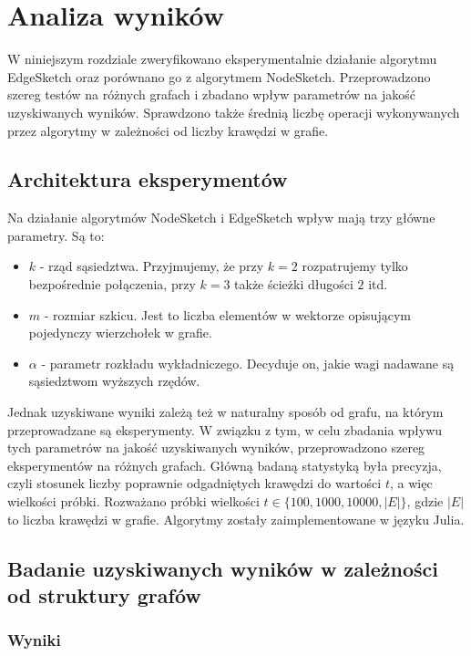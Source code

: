 \chapter{Analiza wyników}

    W niniejszym rozdziale zweryfikowano eksperymentalnie działanie algorytmu EdgeSketch oraz porównano go z algorytmem NodeSketch. Przeprowadzono szereg testów na różnych grafach i zbadano wpływ parametrów na jakość uzyskiwanych wyników. Sprawdzono także średnią liczbę operacji wykonywanych przez algorytmy w zależności od liczby krawędzi w grafie.

\section{Architektura eksperymentów}

    Na działanie algorytmów NodeSketch i EdgeSketch wpływ mają trzy główne parametry. Są to:
    \begin{itemize}
        \item $k$ - rząd sąsiedztwa. Przyjmujemy, że przy $k = 2$ rozpatrujemy tylko bezpośrednie połączenia, przy $k = 3$ także ścieżki długości $2$ itd. 
        \item $m$ - rozmiar szkicu. Jest to liczba elementów w wektorze opisującym pojedynczy wierzchołek w grafie. 
        \item $\alpha$ - parametr rozkładu wykładniczego. Decyduje on, jakie wagi nadawane są sąsiedztwom wyższych rzędów.
    \end{itemize}

    Jednak uzyskiwane wyniki zależą też w naturalny sposób od grafu, na którym przeprowadzane są eksperymenty. W związku z tym, w celu zbadania wpływu tych parametrów na jakość uzyskiwanych wyników, przeprowadzono szereg eksperymentów na różnych grafach. Główną badaną statystyką była precyzja, czyli stosunek liczby poprawnie odgadniętych krawędzi do wartości $t$, a więc wielkości próbki. Rozważano próbki wielkości $t \in \{100, 1000, 10000, |E|\}$, gdzie $|E|$ to liczba krawędzi w grafie. Algorytmy zostały zaimplementowane w języku Julia\cite{Julia}.

\section{Badanie uzyskiwanych wyników w zależności od struktury grafów}

    \subsection{Wyniki}

